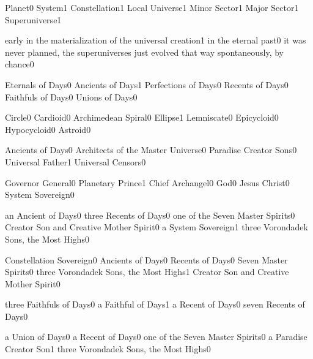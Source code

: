 {Planet}{0}
{System}{1}
{Constellation}{1}
{Local Universe}{1}
{Minor Sector}{1}
{Major Sector}{1}
{Superuniverse}{1}
\qstop

{early in the materialization of the universal creation}{1}
{in the eternal past}{0}
{it was never planned, the superuniverses just evolved that way spontaneously, by chance}{0}
\qstop

{Eternals of Days}{0}
{Ancients of Days}{1}
{Perfections of Days}{0}
{Recents of Days}{0}
{Faithfuls of Days}{0}
{Unions of Days}{0}
\qstop

{Circle}{0}
{Cardioid}{0}
{Archimedean Spiral}{0}
{Ellipse}{1}
{Lemniscate}{0}
{Epicycloid}{0}
{Hypocycloid}{0}
{Astroid}{0}
\qstop

{Ancients of Days}{0}
{Architects of the Master Universe}{0}
{Paradise Creator Sons}{0}
{Universal Father}{1}
{Universal Censors}{0}
\qstop

{Governor General}{0}
{Planetary Prince}{1}
{Chief Archangel}{0}
{God}{0}
{Jesus Christ}{0}
{System Sovereign}{0}
\qstop

{an Ancient of Days}{0}
{three Recents of Days}{0}
{one of the Seven Master Spirits}{0}
{Creator Son and Creative Mother Spirit}{0}
{a System Sovereign}{1}
{three Vorondadek Sons, the Most Highs}{0}
\qstop

{Constellation Sovereign}{0}
{Ancients of Days}{0}
{Recents of Days}{0}
{Seven Master Spirits}{0}
{three Vorondadek Sons, the Most Highs}{1}
{Creator Son and Creative Mother Spirit}{0}
\qstop

{three Faithfuls of Days}{0}
{a Faithful of Days}{1}
{a Recent of Days}{0}
{seven Recents of Days}{0}
\qstop

{a Union of Days}{0}
{a Recent of Days}{0}
{one of the Seven Master Spirits}{0}
{a Paradise Creator Son}{1}
{three Vorondadek Sons, the Most Highs}{0}
\qstop

